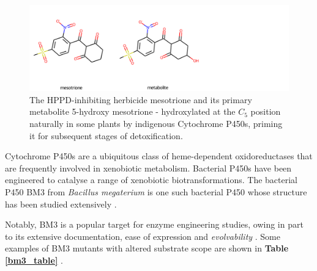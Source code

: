 \documentclass[16pt]{book}
\begin{document}
\par
\begin{figure}
         \begin{center}
         \caption{\label{mesotrione} The HPPD-inhibiting herbicide mesotrione and its primary metabolite 5-hydroxy mesotrione - hydroxylated at the $C_5$ position naturally in some plants by indigenous Cytochrome P450s, priming it for subsequent stages of detoxification.}
         \includegraphics[width = \textwidth]{img/mesotrione+metabolite.png}
         \end{center}
 \end{figure}

 \par

Cytochrome P450s are a ubiquitous class of heme-dependent oxidoreductases that are frequently involved in xenobiotic metabolism. %
Bacterial P450s have been engineered to catalyse a range of xenobiotic biotransformations. The bacterial P450 BM3 from \textit{Bacillus megaterium} is one such bacterial P450 whose structure has been studied extensively \cite{munro2002p450}. 


Notably, BM3 is a popular target for enzyme engineering studies, owing in part to its extensive documentation, ease of expression and \textit{evolvability} \cite{bloom2006protein}.
Some examples of BM3 mutants with altered substrate scope are shown in \textbf{Table \ref{bm3_table}} \cite{wong}.
\par
\end{document}
